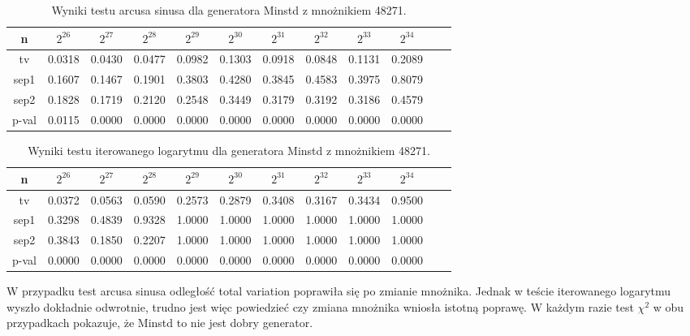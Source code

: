 \documentclass[a4paper,11pt,twoside]{book}
\theoremstyle{definition}
\begin{document}
\begin{table}[ht!]
\centering
 \caption{Wyniki testu arcusa sinusa dla generatora Minstd z mnożnikiem 48271.}
 \label{tab:nminstd_asin}
\begin{tabular} {||c|c|c|c|c|c|c|c|c|c|c|c||}  
 \hline
     n &  $2^{26}$ &  $2^{27}$ &  $2^{28}$ &  $2^{29}$ &  $2^{30}$ &  $2^{31}$ &  $2^{32}$ &  $2^{33}$ &  $2^{34}$\\ \hline
     tv &  0.0318 &  0.0430 &  0.0477 &  0.0982 &  0.1303 &  0.0918 &  0.0848 &  0.1131 &  0.2089\\ \hline
   sep1 &  0.1607 &  0.1467 &  0.1901 &  0.3803 &  0.4280 &  0.3845 &  0.4583 &  0.3975 &  0.8079\\ \hline
   sep2 &  0.1828 &  0.1719 &  0.2120 &  0.2548 &  0.3449 &  0.3179 &  0.3192 &  0.3186 &  0.4579\\ \hline
  p-val &  0.0115 &  0.0000 &  0.0000 &  0.0000 &  0.0000 &  0.0000 &  0.0000 &  0.0000 &  0.0000\\ \hline
\end{tabular}  
\end{table}
\begin{table}[ht!]
\centering
 \caption{Wyniki testu iterowanego logarytmu dla generatora Minstd z mnożnikiem 48271.}
 \label{tab:nminstd_lil}
\begin{tabular} {||c|c|c|c|c|c|c|c|c|c|c|c||}  
 \hline 
     n &  $2^{26}$ &  $2^{27}$ &  $2^{28}$ &  $2^{29}$ &  $2^{30}$ &  $2^{31}$ &  $2^{32}$ &  $2^{33}$ &  $2^{34}$\\ \hline
     tv &  0.0372 &  0.0563 &  0.0590 &  0.2573 &  0.2879 &  0.3408 &  0.3167 &  0.3434 &  0.9500\\ \hline
   sep1 &  0.3298 &  0.4839 &  0.9328 &  1.0000 &  1.0000 &  1.0000 &  1.0000 &  1.0000 &  1.0000\\ \hline
   sep2 &  0.3843 &  0.1850 &  0.2207 &  1.0000 &  1.0000 &  1.0000 &  1.0000 &  1.0000 &  1.0000\\ \hline
  p-val &  0.0000 &  0.0000 &  0.0000 &  0.0000 &  0.0000 &  0.0000 &  0.0000 &  0.0000 &  0.0000\\ \hline
\end{tabular}  
\end{table}

W przypadku test arcusa sinusa odległość total variation poprawiła się po zmianie mnożnika. Jednak w teście iterowanego logarytmu wyszło dokładnie odwrotnie, trudno jest więc powiedzieć czy zmiana mnożnika wniosła istotną poprawę. W każdym razie test $\chi^2$ w obu przypadkach pokazuje, że Minstd to nie jest dobry generator.
\end{document}
